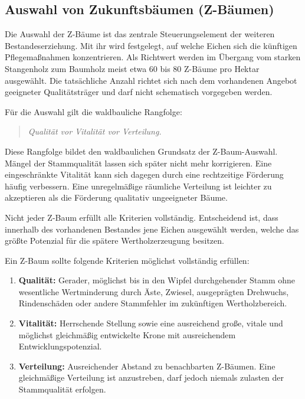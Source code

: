\documentclass[twocolumn, bibliography=totoc, abstract=true]{scrartcl}
\begin{document}
\subsection{Auswahl von Zukunftsbäumen (Z-Bäumen)}

Die Auswahl der Z-Bäume ist das zentrale Steuerungselement der weiteren Bestandeserziehung. Mit ihr wird festgelegt, auf welche Eichen sich die künftigen Pflegemaßnahmen konzentrieren. Als Richtwert werden im Übergang vom starken Stangenholz zum Baumholz meist etwa 60 bis 80 Z-Bäume pro Hektar ausgewählt. Die tatsächliche Anzahl richtet sich nach dem vorhandenen Angebot geeigneter Qualitätsträger und darf nicht schematisch vorgegeben werden.

Für die Auswahl gilt die waldbauliche Rangfolge:

\begin{quote}
\emph{Qualität vor Vitalität vor Verteilung.}
\end{quote}

Diese Rangfolge bildet den waldbaulichen Grundsatz der Z-Baum-Auswahl. Mängel der Stammqualität lassen sich später nicht mehr korrigieren. Eine eingeschränkte Vitalität kann sich dagegen durch eine rechtzeitige Förderung häufig verbessern. Eine unregelmäßige räumliche Verteilung ist leichter zu akzeptieren als die Förderung qualitativ ungeeigneter Bäume.

Nicht jeder Z-Baum erfüllt alle Kriterien vollständig. Entscheidend ist, dass innerhalb des vorhandenen Bestandes jene Eichen ausgewählt werden, welche das größte Potenzial für die spätere Wertholzerzeugung besitzen.

Ein Z-Baum sollte folgende Kriterien möglichst vollständig erfüllen:

\begin{enumerate}
\item \textbf{Qualität:} Gerader, möglichst bis in den Wipfel durchgehender Stamm ohne wesentliche Wertminderung durch Äste, Zwiesel, ausgeprägten Drehwuchs, Rindenschäden oder andere Stammfehler im zukünftigen Wertholzbereich.
\item \textbf{Vitalität:} Herrschende Stellung sowie eine ausreichend große, vitale und möglichst gleichmäßig entwickelte Krone mit ausreichendem Entwicklungspotenzial.
\item \textbf{Verteilung:} Ausreichender Abstand zu benachbarten Z-Bäumen. Eine gleichmäßige Verteilung ist anzustreben, darf jedoch niemals zulasten der Stammqualität erfolgen.
\end{enumerate}
\end{document}
